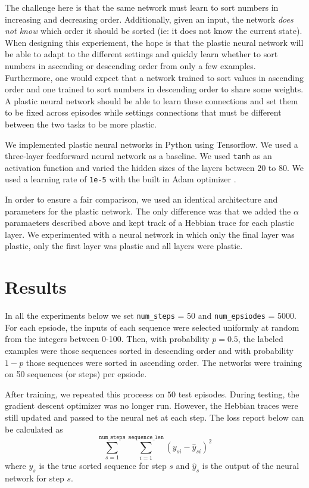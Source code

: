 \documentclass{article}
\begin{document}
The challenge here is that the same network must learn to sort numbers in increasing and decreasing order.
Additionally, given an input, the network \textit{does not know} which order it should be sorted (ie: it does not know the current state).
When designing this experiement, the hope is that the plastic neural network will be able to adapt to the different settings and quickly
learn whether to sort numbers in ascending or descending order from only a few examples. Furthermore, one would expect that a network trained to sort values in
ascending order and one trained to sort numbers in descending order to share some weights. A plastic neural network should be able to learn these connections and set them to be fixed across episodes while settings connections that must be different between the two tasks to be more plastic.

We implemented plastic neural networks in Python using Tensorflow. We used a three-layer feedforward neural network as a baseline. We used \texttt{tanh}
as an activation function and varied the hidden sizes of the layers between 20 to 80. We used a learning rate of \texttt{1e-5} with the built in Adam optimizer \cite{KingmaB14}.

In order to ensure a fair comparison, we used an identical architecture and parameters for the plastic network. The only difference was that we added the $\alpha$ paramaeters described above and kept track of a Hebbian trace for each plastic layer. We experimented with a neural network in which only the final layer was plastic, only the first layer was plastic and all layers were plastic.

\section{Results}

In all the experiments below we set \texttt{num\_steps} = 50 and \texttt{num\_epsiodes} = 5000. For each epsiode, the inputs of each sequence were selected uniformly at random from the integers between 0-100. Then, with probability $p = 0.5$, the labeled examples were those sequences sorted in descending order and with probability $1-p$ those sequences were sorted in ascending order. The networks were training on 50 sequences (or steps) per epsiode.

After training, we repeated this proceess on $50$ test episodes. During testing, the gradient descent optimizer was no longer run. However, the Hebbian traces were still updated and passed to the neural net at each step. The loss report below can be calculated as
$$ \sum_{s = 1}^{\texttt{num\_steps}} \sum_{i = 1}^{\texttt{sequence\_len}} (y_{si} - \hat{y}_{si})^2$$
where $y_s$ is the true sorted sequence for step $s$ and $\hat{y}_{s}$ is the output of the neural network for step $s$.
\end{document}
